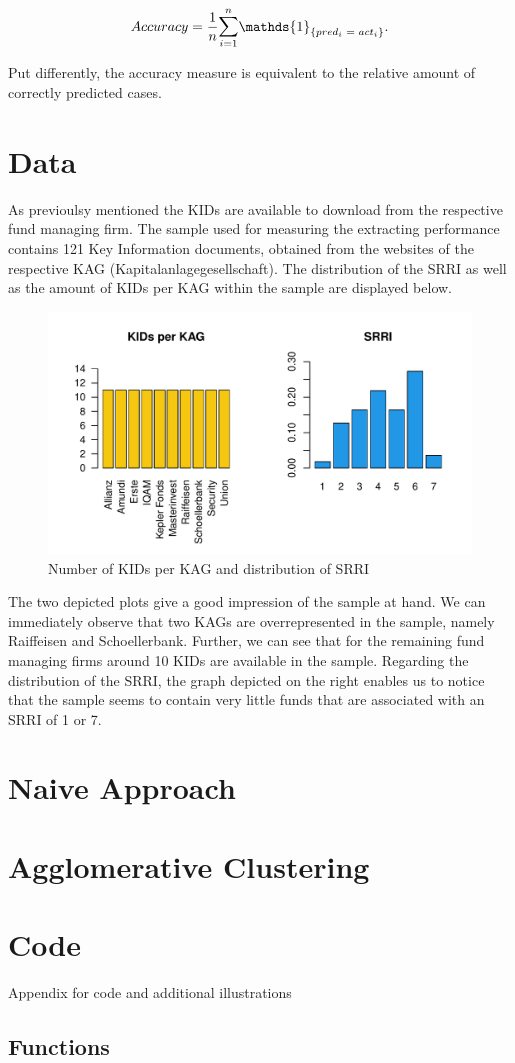 \documentclass[aodsor,preprint]{imsart}
\numberwithin{equation}{section}
\theoremstyle{plain}
\begin{document}
\[
Accuracy = \frac{1}{n}\mathlarger{\sum}_{i = 1}^n\mathds{1}_{\{pred_i \text{ }= \text{ } act_i\}}\text{.}
\]

Put differently, the accuracy measure is equivalent to the relative amount of correctly predicted cases.
\newpage

\section{Data}
As previoulsy mentioned the KIDs are available to download from the respective fund managing firm. The sample used for measuring the extracting performance contains 121 Key Information documents, obtained from the websites of the respective KAG (Kapitalanlagegesellschaft). The distribution of the SRRI as well as the amount of KIDs per KAG within the sample are displayed below.

\begin{figure}[H]
	\includegraphics[width = 12cm]{data_overview}
	\caption{Number of KIDs per KAG and distribution of SRRI}
\end{figure}

The two depicted plots give a good impression of the sample at hand. We can immediately observe that two KAGs are overrepresented in the sample, namely Raiffeisen and Schoellerbank. Further, we can see that for the remaining fund managing firms around 10 KIDs are available in the sample. Regarding the distribution of the SRRI, the graph depicted on the right enables us to notice that the sample seems to contain very little funds that are associated with an SRRI of 1 or 7. 
\section{Naive Approach}

\section{Agglomerative Clustering}
\newpage

\appendix


\section{Code}
\label{sec:app}

Appendix for code and additional illustrations

\subsection{Functions}






\newpage
\printbibliography
\end{document}
